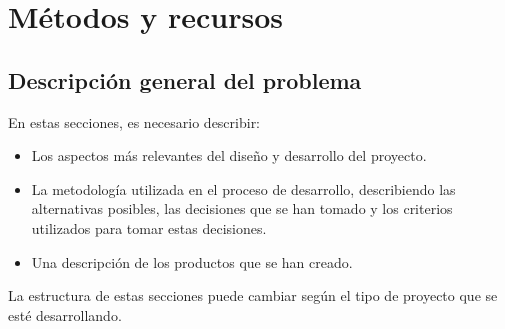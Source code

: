 \chapter{Métodos y recursos}
\label{chapter:Métodos y recursos}


\section{Descripción general del problema}

En estas secciones, es necesario describir:

\begin{itemize}
    \item Los aspectos más relevantes del diseño y desarrollo del proyecto.
    \item La metodología utilizada en el proceso de desarrollo, describiendo las alternativas posibles, las decisiones que se han tomado y los criterios utilizados para tomar estas decisiones.
    \item Una descripción de los productos que se han creado.
\end{itemize}

La estructura de estas secciones puede cambiar según el tipo de proyecto que se esté desarrollando.
